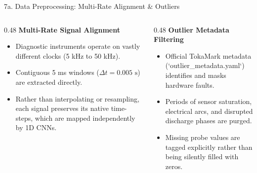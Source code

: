 \documentclass[aspectratio=169, 10pt]{beamer}
\begin{document}
\begin{frame}{7a. Data Preprocessing: Multi-Rate Alignment \& Outliers}
  \begin{columns}[T]
    \begin{column}{0.48\textwidth}
      \textbf{\color{NavyBlue} Multi-Rate Signal Alignment}
      \begin{itemize}
        \item Diagnostic instruments operate on vastly different clocks (5 kHz to 50 kHz).
        \item Contiguous 5 ms windows ($\Delta t = 0.005\text{ s}$) are extracted directly.
        \item Rather than interpolating or resampling, each signal preserves its native time-steps, which are mapped independently by 1D CNNs.
      \end{itemize}
    \end{column}

    \begin{column}{0.48\textwidth}
      \textbf{\color{NavyBlue} Outlier Metadata Filtering}
      \begin{itemize}
        \item Official TokaMark metadata (`outlier\_metadata.yaml`) identifies and masks hardware faults.
        \item Periods of sensor saturation, electrical arcs, and disrupted discharge phases are purged.
        \item Missing probe values are tagged explicitly rather than being silently filled with zeros.
      \end{itemize}
    \end{column}
  \end{columns}
\end{frame}
\end{document}
